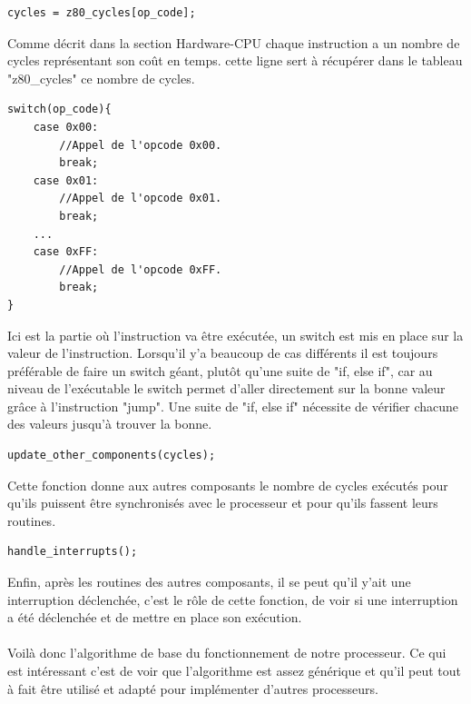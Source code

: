 \documentclass{report}
\begin{document}
\begin{lstlisting}
cycles = z80_cycles[op_code];
\end{lstlisting}
Comme décrit dans la section Hardware-CPU chaque instruction a un nombre de cycles représentant son coût en temps. cette ligne sert à récupérer dans le tableau "z80\_cycles" ce nombre de cycles.
\begin{lstlisting}
switch(op_code){	
	case 0x00:
		//Appel de l'opcode 0x00.
		break;
	case 0x01:
		//Appel de l'opcode 0x01.
		break;
	...
	case 0xFF:
		//Appel de l'opcode 0xFF.
		break;
}
\end{lstlisting}
Ici est la partie où l'instruction va être exécutée, un switch est mis en place sur la valeur de l'instruction. Lorsqu'il y'a beaucoup de cas différents il est toujours préférable de faire un switch géant, plutôt qu'une suite de "if, else if", car au niveau de l'exécutable le switch permet d'aller directement sur la bonne valeur grâce à l'instruction "jump". Une suite de "if, else if" nécessite de vérifier chacune des valeurs jusqu'à trouver la bonne. 
\begin{lstlisting}
update_other_components(cycles);
\end{lstlisting}
Cette fonction donne aux autres composants le nombre de cycles exécutés pour qu'ils puissent être synchronisés avec le processeur et pour qu'ils fassent leurs routines.
\begin{lstlisting}
handle_interrupts();
\end{lstlisting}
Enfin, après les routines des autres composants, il se peut qu'il y'ait une interruption déclenchée, c'est le rôle de cette fonction, de voir si une interruption a été déclenchée et de mettre en place son exécution.\\\\
Voilà donc l'algorithme de base du fonctionnement de notre processeur. Ce qui est intéressant c'est de voir que l'algorithme est assez générique et qu'il peut tout à fait être utilisé et adapté pour implémenter d'autres processeurs.
\end{document}
